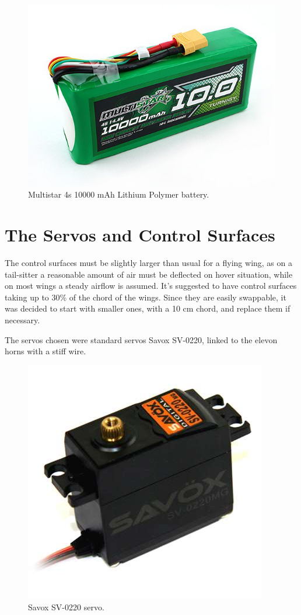 \begin{figure}[H]
\centering
  \includegraphics[width=0.8\linewidth]{figs/battery.jpg}
  \caption{Multistar 4s 10000 mAh Lithium Polymer battery.}
  \label{fig:multistar}
\end{figure}


\section{The Servos and Control Surfaces}

The control surfaces must be slightly larger than usual for a flying wing, as on a tail-sitter a reasonable amount of air must be deflected on hover situation, while on most wings a steady airflow is assumed. It's suggested to have control surfaces taking up to 30\% of the chord of the wings. Since they are easily swappable, it was decided to start with smaller ones, with a 10 cm chord, and replace them if necessary.


The servos chosen were standard servos Savox SV-0220, linked to the elevon horns with a stiff wire. %

\begin{figure}[H]
\centering
  \includegraphics[width=0.6\linewidth]{figs/servo.jpg}
  \caption{Savox SV-0220 servo.}
  \label{fig:sv-0220}
\end{figure}


